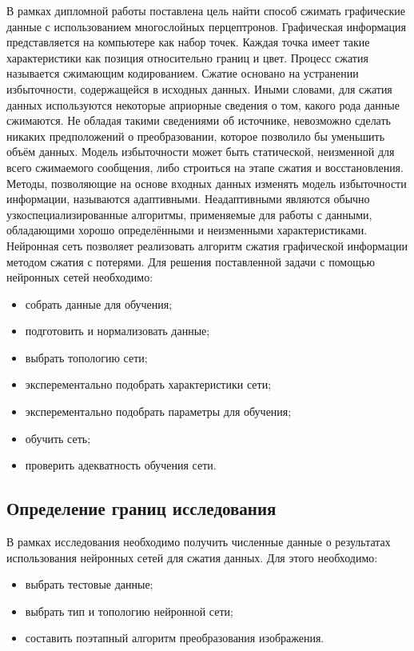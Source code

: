В рамках дипломной работы поставлена цель найти способ сжимать графические данные с использованием многослойных перцептронов.
Графическая информация представляется на компьютере как набор точек.
Каждая точка имеет такие характеристики как позиция относительно границ и цвет.
Процесс сжатия называется сжимающим кодированием. Сжатие основано на устранении избыточности, содержащейся в исходных данных.
Иными словами, для сжатия данных используются некоторые априорные сведения о том, какого рода данные сжимаются.
Не обладая такими сведениями об источнике, невозможно сделать никаких предположений о преобразовании, которое позволило бы уменьшить объём данных.
Модель избыточности может быть статической, неизменной для всего сжимаемого сообщения, либо строиться на этапе сжатия и восстановления.
Методы, позволяющие на основе входных данных изменять модель избыточности информации, называются адаптивными.
Неадаптивными являются обычно узкоспециализированные алгоритмы, применяемые для работы с данными, обладающими хорошо определёнными и неизменными характеристиками.
Нейронная сеть позволяет реализовать алгоритм сжатия графической информации методом сжатия с потерями.
Для решения поставленной задачи с помощью нейронных сетей необходимо:
\begin{itemize}
  \item собрать данные для обучения;
  \item подготовить и нормализовать данные;
  \item выбрать топологию сети;
  \item	эксперементально подобрать характеристики сети;
  \item	эксперементально подобрать параметры для обучения;
  \item	обучить сеть;
  \item	проверить адекватность обучения сети.
\end{itemize}

\subsection{Определение границ исследования}
\label{sub:practice:task_milestone}

В рамках исследования необходимо получить численные данные о результатах использования нейронных сетей для сжатия данных.
Для этого необходимо:
\begin{itemize}
  \item выбрать тестовые данные;
  \item выбрать тип и топологию нейронной сети;
  \item составить поэтапный алгоритм преобразования изображения.
\end{itemize}

